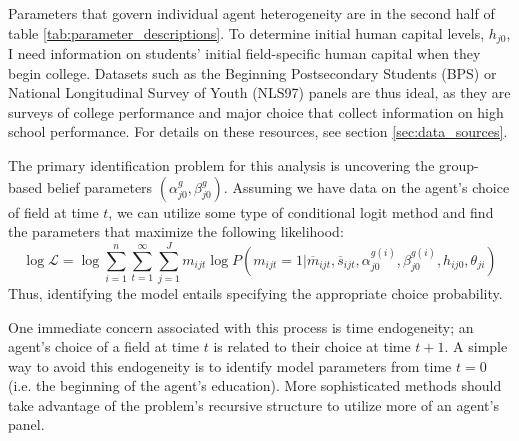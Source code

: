\documentclass[11 pt]{article}
\begin{document}
Parameters that govern individual agent heterogeneity are in the second half of table \ref{tab:parameter_descriptions}.
To determine initial human capital levels, $h_{j0}$, I need information on students' initial field-specific human capital when they begin college.
Datasets such as the Beginning Postsecondary Students (BPS) or National Longitudinal Survey of Youth (NLS97) panels are thus ideal, as they are surveys of college performance and major choice that collect information on high school performance. 
For details on these resources, see section \ref{sec:data_sources}. 

The primary identification problem for this analysis is uncovering the group-based belief parameters $(\alpha_{j0}^g, \beta_{j0}^g)$.
Assuming we have data on the agent's choice of field at time $t$, we can utilize some type of conditional logit method and find the parameters that maximize the following likelihood:
\begin{equation*}
    \log \mathcal{L} 
    = 
    \log \sum_{i = 1}^n \sum_{t=1}^\infty \sum_{j=1}^J m_{ijt} 
    \log P(m_{ijt} = 1 \vert \overline{m}_{ijt}, \overline{s}_{ijt}, \alpha_{j0}^{g(i)}, \beta_{j0}^{g(i)}, h_{ij0}, \theta_{ji})
\end{equation*}
Thus, identifying the model entails specifying the appropriate choice probability.

One immediate concern associated with this process is time endogeneity; an agent's choice of a field at time $t$ is related to their choice at time $t+1$. A simple way to avoid this endogeneity is to identify model parameters from time $t=0$ (i.e. the beginning of the agent's education).
More sophisticated methods should take advantage of the problem's recursive structure to utilize more of an agent's panel. 
\end{document}
